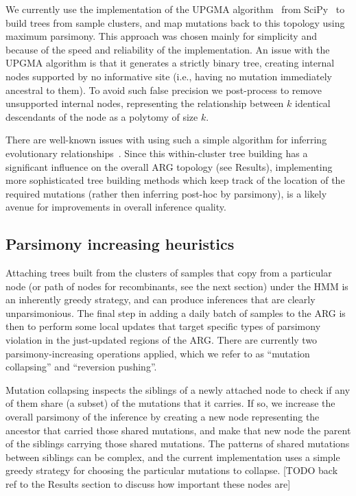 \documentclass{article}
\begin{document}
We currently use the implementation of the UPGMA algorithm~\citep{Michener1957-tr}
from SciPy~\citep{Pauli2020-scipy} to build trees from sample
clusters, and map mutations back to this topology using maximum parsimony.
This approach was chosen mainly for simplicity and because of the
speed and reliability of the implementation.
An issue with the UPGMA algorithm is that it generates a strictly
binary tree, creating internal nodes
supported by no informative site (i.e., having no mutation immediately
ancestral to them). To avoid such false precision we post-process
to remove unsupported internal nodes, representing the relationship
between $k$ identical descendants of the node as a polytomy of size $k$.

There are well-known issues with using such a simple algorithm for inferring
evolutionary relationships~\citep{Felsenstein2004-inferring}.
Since this within-cluster tree building has a significant influence on the
overall ARG topology (see Results), implementing more sophisticated
tree building methods which keep track of the location of the required mutations
(rather then inferring post-hoc by parsimony), is a likely avenue
for improvements in overall inference quality.

\subsection{Parsimony increasing heuristics}
\label{sec:parsimony-heuristics}
Attaching trees built from the clusters of samples that copy from
a particular node (or path of nodes for recombinants, see the
next section) under the HMM is an inherently greedy strategy,
and can produce inferences that are clearly unparsimonious.
The final step in adding a daily batch of samples to the ARG
is then to perform some local updates that target specific
types of parsimony violation in the just-updated regions of the
ARG. There are currently two parsimony-increasing operations
applied, which we refer to as ``mutation collapsing'' and ``reversion
pushing''.

Mutation collapsing inspects the siblings of a newly attached node
to check if any of them share (a subset) of the mutations that
it carries. If so, we increase the overall parsimony of the inference
by creating a new node representing the ancestor that carried
those shared mutations, and make that new node the parent of the
siblings carrying those shared mutations. The patterns of
shared mutations between siblings can be complex, and the current
implementation uses a simple greedy strategy for choosing
the particular mutations to collapse. [TODO back ref to the
Results section to discuss how important these nodes are]
\end{document}
